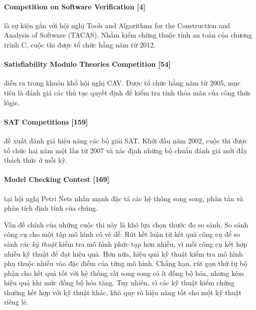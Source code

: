 \paragraph{Competition on Software Verification [4]}
là sự kiện gắn với hội nghị Tools and Algorithms for the Construction and Analysis of Software (TACAS). Nhằm kiểm chứng thuộc tính an toàn của chương trình C, cuộc thi được tổ chức hằng năm từ 2012.

\paragraph{Satisfiability Modulo Theories Competition [54]}
diễn ra trong khuôn khổ hội nghị CAV. Được tổ chức hằng năm từ 2005, mục tiêu là đánh giá các thủ tục quyết định để kiểm tra tính thỏa mãn của công thức lôgic.

\paragraph{SAT Competitions [159]}
đề xuất đánh giá hiệu năng các bộ giải SAT. Khởi đầu năm 2002, cuộc thi được tổ chức hai năm một lần từ 2007 và xác định những bộ chuẩn đánh giá mới đầy thách thức ở mỗi kỳ.

\paragraph{Model Checking Contest [169]}
tại hội nghị Petri Nets nhấn mạnh đặc tả các hệ thống song song, phân tán và phân tích định tính của chúng.

Vấn đề chính của những cuộc thi này là khó lựa chọn thước đo so sánh. So sánh công cụ cho một tập mô hình có vẻ dễ. Rút kết luận từ kết quả công cụ để so sánh các \emph{kỹ thuật} kiểm tra mô hình phức tạp hơn nhiều, vì mỗi công cụ kết hợp nhiều kỹ thuật để đạt hiệu quả. Hơn nữa, hiệu quả kỹ thuật kiểm tra mô hình phụ thuộc nhiều vào đặc điểm của từng mô hình. Chẳng hạn, rút gọn thứ tự bộ phận cho kết quả tốt với hệ thống rất song song có ít đồng bộ hóa, nhưng kém hiệu quả khi mức đồng bộ hóa tăng. Tuy nhiên, vì các kỹ thuật kiểm chứng thường kết hợp với kỹ thuật khác, khó quy rõ hiệu năng tốt cho một kỹ thuật riêng lẻ.

